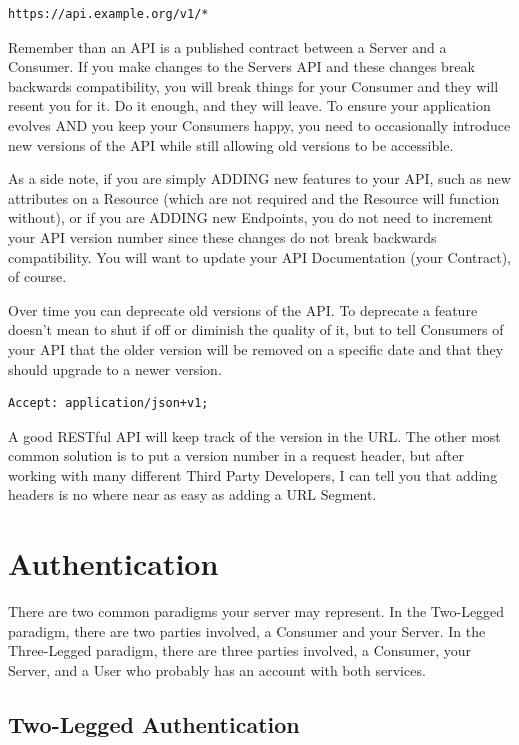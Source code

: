\documentclass{book}
\begin{document}
\begin{verbatim}
https://api.example.org/v1/*
\end{verbatim}

Remember than an API is a published contract between a Server and a Consumer. If you make changes to the Servers API and these changes break backwards compatibility, you will break things for your Consumer and they will resent you for it. Do it enough, and they will leave. To ensure your application evolves AND you keep your Consumers happy, you need to occasionally introduce new versions of the API while still allowing old versions to be accessible.

As a side note, if you are simply ADDING new features to your API, such as new attributes on a Resource (which are not required and the Resource will function without), or if you are ADDING new Endpoints, you do not need to increment your API version number since these changes do not break backwards compatibility. You will want to update your API Documentation (your Contract), of course.

Over time you can deprecate old versions of the API. To deprecate a feature doesn't mean to shut if off or diminish the quality of it, but to tell Consumers of your API that the older version will be removed on a specific date and that they should upgrade to a newer version.

\begin{verbatim}
Accept: application/json+v1;
\end{verbatim}

A good RESTful API will keep track of the version in the URL. The other most common solution is to put a version number in a request header, but after working with many different Third Party Developers, I can tell you that adding headers is no where near as easy as adding a URL Segment.


\section{Authentication}

There are two common paradigms your server may represent. In the Two-Legged paradigm, there are two parties involved, a Consumer and your Server. In the Three-Legged paradigm, there are three parties involved, a Consumer, your Server, and a User who probably has an account with both services.

\subsection{Two-Legged Authentication}
\end{document}
